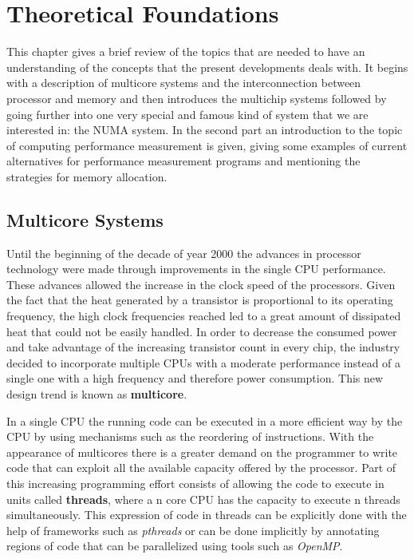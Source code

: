 \chapter{Theoretical Foundations}\label{chapter:theorethical}
This chapter gives a brief review of the topics that are needed to have an understanding of the concepts that the present developments deals with. It begins with a description of multicore systems and the interconnection between processor and memory and then introduces the multichip systems followed by going further into one very special and famous kind of system that we are interested in: the NUMA system. In the second part an introduction to the topic of computing performance measurement is given, giving some examples of current alternatives for performance measurement programs and mentioning the strategies for memory allocation.

\section{Multicore Systems}\label{section:multicore}
Until the beginning of the decade of year 2000 the advances in processor technology were made through improvements in the single CPU performance. These advances allowed the increase in the clock speed of the processors. Given the fact that the heat generated by a transistor is proportional to its operating frequency, the high clock frequencies reached led to a great amount of dissipated heat that could not be easily handled. In order to decrease the consumed power and take advantage of the increasing transistor count in every chip, the industry decided to incorporate multiple CPUs with a moderate performance instead of a single one with a high frequency and therefore power consumption. This new design trend is known as \textbf{multicore}. 

In a single CPU the running code can be executed in a more efficient way by the CPU by using mechanisms such as the reordering of instructions. With the appearance of multicores there is a greater demand on the programmer to write code that can exploit all the available capacity offered by the processor. Part of this increasing programming effort consists of allowing the code to execute in units called \textbf{threads}, where a n core CPU has the capacity to execute n threads simultaneously. This expression of code in threads can be explicitly done with the help of frameworks such as \textit{pthreads} or can be done implicitly by annotating regions of code that can be parallelized using tools such as \textit{OpenMP}.

